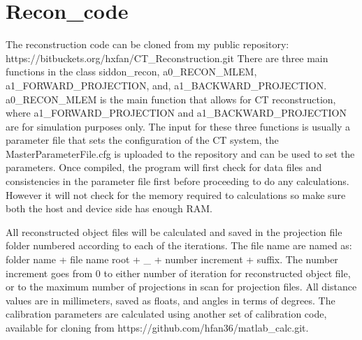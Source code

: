 \chapter{Recon_code}

The reconstruction code can be cloned from my public repository: https://bitbuckets.org/hxfan/CT_Reconstruction.git
There are three main functions in the class siddon_recon, a0_RECON_MLEM, a1_FORWARD_PROJECTION, and, a1_BACKWARD_PROJECTION.  a0_RECON_MLEM is the main function that allows for CT reconstruction, where a1_FORWARD_PROJECTION and a1_BACKWARD_PROJECTION are for simulation purposes only.  The input for these three functions is usually a parameter file that sets the configuration of the CT system, the MasterParameterFile.cfg is uploaded to the repository and can be used to set the parameters.  Once compiled, the program will first check for data files and consistencies in the parameter file first before proceeding to do any calculations.  However it will not check for the memory required to calculations so make sure both the host and device side has enough RAM.  

All reconstructed object files will be calculated and saved in the projection file folder numbered according to each of the iterations.  The file name are named as:
folder name + file name root + _ + number increment + suffix.  The number increment goes from 0 to either number of iteration for reconstructed object file, or to the maximum number of projections in scan for projection files.  All distance values are in millimeters, saved as floats, and angles in terms of degrees.  The calibration parameters are calculated using another set of calibration code, available for cloning from https://github.com/hfan36/matlab_calc.git.